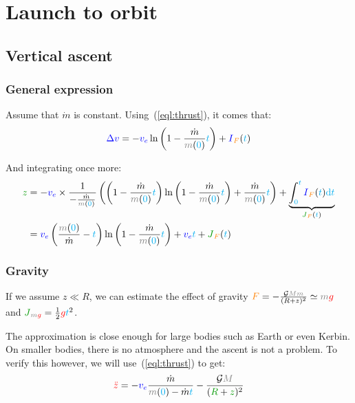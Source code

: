 \chapter{Launch to orbit}
\banner
{}



\section{Vertical ascent}


\subsection{General expression}

Assume that $\dot m$ is constant. Using~(\ref{eql:thrust}), it comes that:
\[
\speed{\Delta v}
= - \speed{v_e} \ln\left(1 - \frac {\dot m} {\mass{m}(\delay{0})} \delay{t}\right)
  + \speed{I}_{\force{F}}(\delay{t})
\]

And integrating once more:
\begin{align*}
\dist{z}
&= - \speed{v_e} \times \frac 1 {- \frac {\dot m} {\mass{m}(\delay{0})}}
\left(
	\left(1 - \frac {\dot m} {\mass{m}(\delay{0})} \delay{t}\right)
	\ln\left(1 - \frac {\dot m} {\mass{m}(\delay{0})} \delay{t}\right)
	+ \frac {\dot m} {\mass{m}(\delay{0})} \delay{t}
\right) + \underbrace{
	\int_{\delay{0}}^{\delay{t}} \speed{I}_{\force{F}}(\delay{t}) \delay{\dt}
}_{\dist{J}_{\force{F}}(\delay{t})} \\
& = \speed{v_e}
	\left(\frac {\mass{m}(\delay{0})} {\dot m} - \delay{t}\right)
	\ln\left(1 - \frac {\dot m} {\mass{m}(\delay{0})} \delay{t}\right)
	+ \speed{v_e} \delay{t}
+ \dist{J}_{\force{F}}(\delay{t})
\end{align*}


\subsection{Gravity}

If we assume $z \ll R$, we can estimate the effect of gravity $\force{F}
= - \frac {\mathcal G \mass{M} \mass{m}} {(R+z)^2} \simeq \mass{m}
\accel{g}$ and $\dist{J}_{\mass{m} \accel{g}} = \frac 1 2 \accel{g}
\delay{t}^2$.

The approximation is close enough for large bodies such as Earth or even
Kerbin. On smaller bodies, there is no atmosphere and the ascent is not
a problem. To verify this however, we will use~(\ref{eql:thrust}) to get:
\[
\accel{\ddot z}
= - \speed{v_e} \frac {\dot m} {\mass{m}(\delay{0}) - \dot m \delay{t}} - \frac {\mathcal G \mass{M}} {(\dist{R}+\dist{z})^2}
\]

